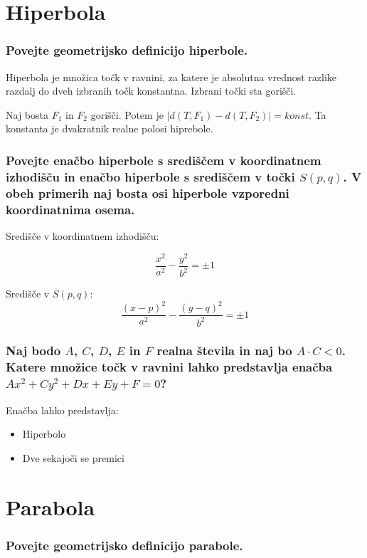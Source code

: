 \documentclass{article}
\begin{document}
\section{Hiperbola}

\subsubsection*{Povejte geometrijsko definicijo hiperbole.}

Hiperbola je množica točk v ravnini, za katere je absolutna vrednost razlike razdalj do dveh izbranih točk konstantna. Izbrani točki sta gorišči.

\vspace{5mm}

Naj bosta $F_1$ in $F_2$ gorišči. Potem je $|d(T, F_1) - d(T, F_2)| = konst$. Ta konstanta je dvakratnik realne polosi hiprebole.

\subsubsection*{Povejte enačbo hiperbole s središčem v koordinatnem izhodišču in enačbo hiperbole s središčem v točki $S(p, q)$. V obeh primerih naj bosta osi hiperbole vzporedni koordinatnima osema.}

Središče v koordinatnem izhodišču:

$$
\frac{x^2}{a^2} - \frac{y^2}{b^2} = \pm 1
$$

Središče v $S(p, q)$:
$$
\frac{(x-p)^2}{a^2} - \frac{(y-q)^2}{b^2} = \pm 1
$$

\subsubsection*{Naj bodo $A$, $C$, $D$, $E$ in $F$ realna števila in naj bo $A \cdot C<0$. Katere množice točk v ravnini lahko predstavlja enačba $A x^{2}+C y^{2}+D x+E y+F=0$?}

Enačba lahko predstavlja:

\begin{itemize}
    \item Hiperbolo
    \item Dve sekajoči se premici
\end{itemize}

\section{Parabola}

\subsubsection*{Povejte geometrijsko definicijo parabole.}
\end{document}
